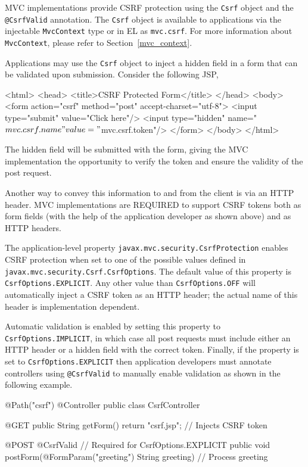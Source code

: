 MVC implementations provide CSRF protection using the {\tt Csrf} object
and the {\tt @CsrfValid} annotation. The {\tt Csrf} object is available to applications
via the injectable {\tt MvcContext} type or in EL as {\tt mvc.csrf}. For more information
about {\tt MvcContext}, please refer to Section~\ref{mvc_context}. 

Applications may use the {\tt Csrf} object to inject a hidden field in a form that can be validated 
upon submission. Consider the following JSP,

\begin{listing}{1}
<html>
<head>
    <title>CSRF Protected Form</title>
</head>
<body>
    <form action="csrf" method="post" accept-charset="utf-8">
        <input type="submit" value="Click here"/>
        <input type="hidden" name="${mvc.csrf.name}" 
                             value="${mvc.csrf.token}"/>
    </form>
</body>
</html>
\end{listing}

The hidden field will be submitted with the form, giving the MVC implementation
the opportunity to verify the token and ensure the validity of the post request. 

Another way to convey this information to and from the client is via an HTTP
header. MVC implementations are REQUIRED to support CSRF tokens both
as form fields (with the help of the application developer as shown above) and
as HTTP headers.

The application-level property {\tt javax.mvc.security.CsrfProtection} enables
 CSRF protection when set to one of the possible values defined in
{\tt javax.mvc.security.Csrf.CsrfOptions}. The default value of this property is
{\tt CsrfOptions.EXPLICIT}. Any other value than {\tt CsrfOptions.OFF} will
automatically inject a CSRF token as an HTTP header; the actual name of this
header is implementation dependent.

Automatic validation is enabled by setting this
property to {\tt CsrfOptions.IMPLICIT}, in which case all post requests
must include either an HTTP header or a hidden field with the correct token.
Finally, if the property is set to {\tt CsrfOptions.EXPLICIT} then application
developers must annotate controllers using {\tt @CsrfValid} to manually
enable validation  as shown in the following example.

\begin{listing}{1}
@Path("csrf")
@Controller
public class CsrfController {

    @GET
    public String getForm() {
        return "csrf.jsp";     // Injects CSRF token
    }

    @POST
    @CsrfValid		           // Required for CsrfOptions.EXPLICIT
    public void postForm(@FormParam("greeting") String greeting) {
        // Process greeting
    }
}
 \end{listing}

